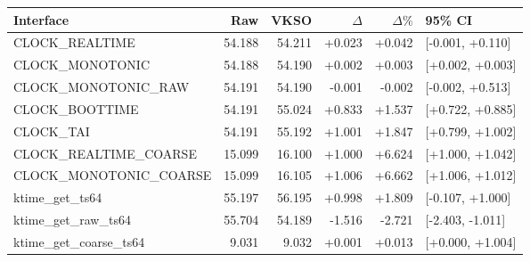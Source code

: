 \begin{tabular}{lrrrrl}
\toprule
Interface & Raw & VKSO & $\Delta$ & $\Delta\%$ & 95\% CI \\
\midrule
CLOCK\_REALTIME & 54.188 & 54.211 & +0.023 & +0.042 & [-0.001, +0.110] \\
CLOCK\_MONOTONIC & 54.188 & 54.190 & +0.002 & +0.003 & [+0.002, +0.003] \\
CLOCK\_MONOTONIC\_RAW & 54.191 & 54.190 & -0.001 & -0.002 & [-0.002, +0.513] \\
CLOCK\_BOOTTIME & 54.191 & 55.024 & +0.833 & +1.537 & [+0.722, +0.885] \\
CLOCK\_TAI & 54.191 & 55.192 & +1.001 & +1.847 & [+0.799, +1.002] \\
CLOCK\_REALTIME\_COARSE & 15.099 & 16.100 & +1.000 & +6.624 & [+1.000, +1.042] \\
CLOCK\_MONOTONIC\_COARSE & 15.099 & 16.105 & +1.006 & +6.662 & [+1.006, +1.012] \\
ktime\_get\_ts64 & 55.197 & 56.195 & +0.998 & +1.809 & [-0.107, +1.000] \\
ktime\_get\_raw\_ts64 & 55.704 & 54.189 & -1.516 & -2.721 & [-2.403, -1.011] \\
ktime\_get\_coarse\_ts64 & 9.031 & 9.032 & +0.001 & +0.013 & [+0.000, +1.004] \\
\bottomrule
\end{tabular}
